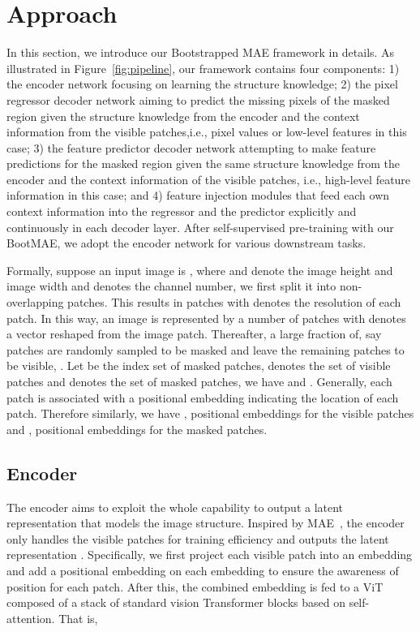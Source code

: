 \documentclass[runningheads]{llncs}
\begin{document}
\section{Approach}
\vspace{-1mm}
In this section, we introduce our Bootstrapped MAE framework in details.
As illustrated in Figure~\ref{fig:pipeline}, our framework contains four components: 1)  the encoder network focusing on learning the structure knowledge; 2) the pixel regressor decoder network aiming to predict the missing pixels of the masked region given the structure knowledge from the encoder and the context information from the visible patches,i.e.,  pixel values or low-level features in this case; 3) the feature predictor decoder network attempting to make feature predictions for the masked region given the same structure knowledge from the encoder and the context information of the visible patches, i.e., high-level feature information in this case;
and 4) feature injection modules that feed each own context information into the regressor and the predictor explicitly and continuously in each decoder layer. After self-supervised pre-training with our BootMAE, we adopt the encoder network for various downstream tasks.

 
Formally, suppose an input image is , where  and  denote the image height and image width and  denotes the channel number, we first split it into non-overlapping patches. This results in  patches with  denotes the resolution of each patch. In this way, an image is represented by a number of patches  with  denotes a vector reshaped from the image patch. 
Thereafter, a large fraction of, say  patches are randomly sampled to be masked and leave the remaining  patches to be visible, .
Let  be the index set of masked patches,  denotes the set of visible patches and  denotes the set of masked patches, we have  and .
Generally, each patch is associated with a positional embedding indicating the location of each patch. Therefore similarly, we have , positional embeddings for the visible patches and , positional embeddings for the masked patches.




\vspace{-1mm}
\subsection{Encoder}
\vspace{-1mm}
The encoder aims to exploit the whole capability to output a latent representation that models the image structure. 
Inspired by MAE~\cite{he2021masked},
the encoder only handles the visible patches  for training efficiency and outputs the latent representation . 
Specifically, we first project each visible patch into an embedding and add a positional embedding on each embedding to ensure the awareness of position for each patch. After this, the combined embedding is fed to a ViT~\cite{dosovitskiy2020image} composed of a stack of standard vision Transformer blocks based on self-attention. That is,
\end{document}
